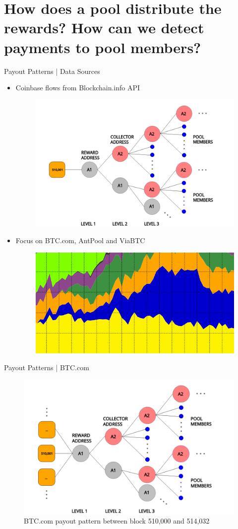 \documentclass[10pt]{beamer}
\def\secondRQ{How does a pool distribute the rewards? How can we detect payments to pool members?}
\begin{document}
\section{\secondRQ}
\begin{frame}[fragile]{Payout Patterns | Data Sources}
    \begin{itemize}
        \item Coinbase flows from Blockchain.info API
        \begin{figure}
            \includegraphics[width=.4\textwidth]{images/flow_example.png}
        \end{figure}
        \pause

        \item Focus on BTC.com, AntPool and ViaBTC
        \begin{figure}
            \includegraphics[width=.35\textwidth]{images/selected_pools.png}
        \end{figure} 

    \end{itemize}
\end{frame}

\begin{frame}[fragile]{Payout Patterns | BTC.com}
    \begin{figure}
        \includegraphics[width=.8\textwidth]{images/flow_BTCcom_example1.png}
        \\BTC.com payout pattern between block 510,000 and 514,032
    \end{figure}
\end{frame}
\end{document}
